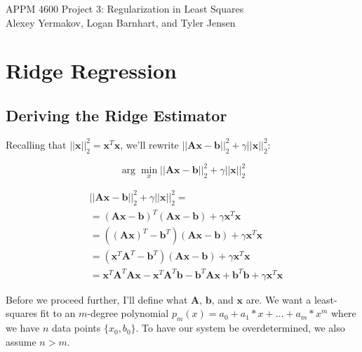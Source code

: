 \documentclass{article}
\newcommand{\x}{\mathbf{x}}
\newcommand{\A}{\mathbf{A}}
\newcommand{\B}{\mathbf{b}} %
\begin{document}
APPM 4600 Project 3: Regularization in Least Squares\\
Alexey Yermakov, Logan Barnhart, and Tyler Jensen

\section{Ridge Regression}
\subsection{Deriving the Ridge Estimator}

Recalling that $||\mathbf{x}||_{2}^{2}=\mathbf{x}^T \mathbf{x}$, we'll rewrite $||\mathbf{Ax}-\mathbf{b}||_{2}^{2} + \gamma||\mathbf{x}||_{2}^{2}$:

\begin{equation} \label{eqn:rls}
    \arg \min_{x} ||\A\x-\B||_{2}^{2} + \gamma||\x||_{2}^{2}
\end{equation}

\begin{equation*}
\begin{split}
    & ||\A\x-\B||_{2}^{2} + \gamma||\x||_{2}^{2} =\\
    & =  (\A\x - \B)^T (\A\x - \B) + \gamma \x^T \x \\ 
    & =  ((\A\x)^T - \B^T) (\A\x - \B) + \gamma \x^T \x \\ 
    & =  (\x^T\A^T - \B^T) (\A\x - \B) + \gamma \x^T \x \\ 
    & = \x^T \A^T \A\x - \x^T \A^T \B - \B^T \A\x + \B^T \B + \gamma \x^T \x
\end{split}
\end{equation*}

Before we proceed further, I'll define what $\A$, $\B$, and $\x$ are. We want a least-squares fit to an $m$-degree polynomial $p_m(x)=a_0+a_1*x+\ldots+a_m*x^m$ where we have $n$ data points $\{x_0,b_0\}$. To have our system be overdetermined, we also assume $n > m$.
\end{document}
